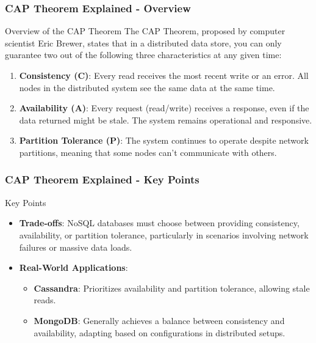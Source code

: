 \documentclass[aspectratio=169]{beamer}
\begin{document}
\begin{frame}[fragile]
  \frametitle{CAP Theorem Explained - Overview}
  \begin{block}{Overview of the CAP Theorem}
    The CAP Theorem, proposed by computer scientist Eric Brewer, states that in a distributed data store, you can only guarantee two out of the following three characteristics at any given time:
  \end{block}
  \begin{enumerate}
    \item \textbf{Consistency (C)}: Every read receives the most recent write or an error. All nodes in the distributed system see the same data at the same time.
    
    \item \textbf{Availability (A)}: Every request (read/write) receives a response, even if the data returned might be stale. The system remains operational and responsive.
    
    \item \textbf{Partition Tolerance (P)}: The system continues to operate despite network partitions, meaning that some nodes can’t communicate with others.
  \end{enumerate}
\end{frame}

\begin{frame}[fragile]
  \frametitle{CAP Theorem Explained - Key Points}
  \begin{block}{Key Points}
    \begin{itemize}
      \item \textbf{Trade-offs}: NoSQL databases must choose between providing consistency, availability, or partition tolerance, particularly in scenarios involving network failures or massive data loads.
      \item \textbf{Real-World Applications}:
        \begin{itemize}
          \item \textbf{Cassandra}: Prioritizes availability and partition tolerance, allowing stale reads.
          \item \textbf{MongoDB}: Generally achieves a balance between consistency and availability, adapting based on configurations in distributed setups.
        \end{itemize}
    \end{itemize}
  \end{block}
\end{frame}
\end{document}
